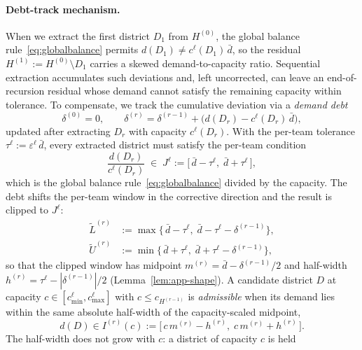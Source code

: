\documentclass[preprint,12pt,authoryear]{elsarticle}
\theoremstyle{definition}
\begin{document}
\paragraph{Debt-track mechanism.}
When we extract the first district $D_1$ from $H^{(0)}$, the global balance
rule~\eqref{eq:globalbalance} permits $d(D_1)\neq c^{\ell}(D_1)\,\bar d$, so
the residual $H^{(1)} := H^{(0)}\setminus D_1$ carries a skewed
demand-to-capacity ratio. Sequential extraction accumulates such deviations
and, left uncorrected, can leave an end-of-recursion residual whose demand
cannot satisfy the remaining capacity within tolerance. To compensate, we
track the cumulative deviation via a \emph{demand debt}
\begin{equation}\label{eq:delta}
    \delta^{(0)} = 0, \qquad
    \delta^{(r)} = \delta^{(r-1)} + \bigl(d(D_r) - c^{\ell}(D_r)\,\bar{d}\bigr),
\end{equation}
updated after extracting $D_r$ with capacity $c^\ell(D_r)$. With the
per-team tolerance $\tau^{\ell} := \varepsilon^{\ell}\,\bar d$, every
extracted district must satisfy the per-team condition
\begin{equation}\label{eq:per-team-window}
   \frac{d(D_r)}{c^{\ell}(D_r)} \;\in\; J^{\ell} :=
   \bigl[\,\bar d-\tau^{\ell},\; \bar d+\tau^{\ell}\,\bigr],
\end{equation}
which is the global balance rule~\eqref{eq:globalbalance} divided by the
capacity. The debt shifts the per-team window in the corrective direction
and the result is clipped to $J^{\ell}$:
\begin{align}
    \widetilde L^{(r)} &:= \max\bigl\{\,\bar d-\tau^{\ell},\;
        \bar d-\tau^{\ell}-\delta^{(r-1)}\bigr\}, \label{eq:Li} \\
    \widetilde U^{(r)} &:= \min\bigl\{\,\bar d+\tau^{\ell},\;
        \bar d+\tau^{\ell}-\delta^{(r-1)}\bigr\}, \label{eq:Ui}
\end{align}
so that the clipped window has midpoint $m^{(r)} = \bar d-\delta^{(r-1)}/2$
and half-width $h^{(r)} = \tau^{\ell}-|\delta^{(r-1)}|/2$
(Lemma~\ref{lem:app-shape}). A candidate district $D$ at capacity
$c\in[c^{\ell}_{\min},c^{\ell}_{\max}]$ with $c\le c_{H^{(r-1)}}$ is
\emph{admissible} when its demand lies within the same absolute half-width
of the capacity-scaled midpoint,
\begin{equation}\label{eq:window}
    d(D) \in I^{(r)}(c) := \bigl[\,c\,m^{(r)}-h^{(r)},\; c\,m^{(r)}+h^{(r)}\,\bigr].
\end{equation}
The half-width does not grow with $c$: a district of capacity $c$ is held
\end{document}
